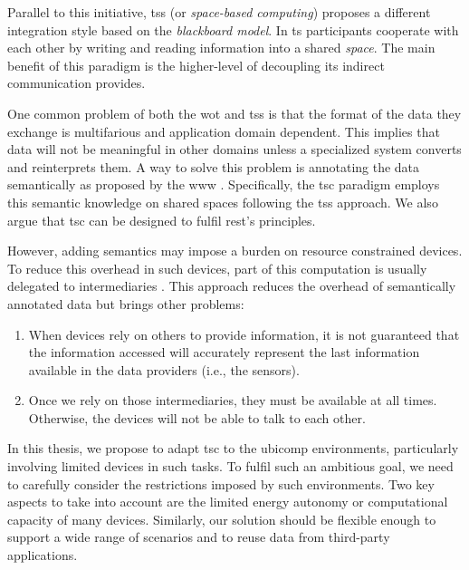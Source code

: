 
Parallel to this initiative, \aclp{ts} (or \emph{space-based computing}) \citep{gelernter_generative_1985} proposes a different integration style based on the \emph{blackboard model}.
In \ac{ts} participants cooperate with each other by writing and reading information into a shared \emph{space}.
The main benefit of this paradigm is the higher-level of decoupling its indirect communication provides. %


\bigskip

One common problem of both the \ac{wot} and \aclp{ts} is that the format of the data they exchange is multifarious and application domain dependent.
This implies that data will not be meaningful in other domains unless a specialized system converts and reinterprets them.
A way to solve this problem is annotating the data semantically as proposed by the \ac{www} \citep{berners-lee_semantic_2001}.
Specifically, the \ac{tsc} paradigm \citep{fensel_triple-space_2004} employs this semantic knowledge on shared spaces following the \aclp{ts} approach.
We also argue that \ac{tsc} can be designed to fulfil \ac{rest}'s principles.


However, adding semantics may impose a burden on resource constrained devices.
To reduce this overhead in such devices, part of this computation is usually delegated to intermediaries \citep{honkola_smart-m3_2010}. %
This approach reduces the overhead of semantically annotated data but brings other problems:
\begin{enumerate}
 \item When devices rely on others to provide information, it is not guaranteed that the information accessed will accurately represent the last information available in the data providers (i.e., the sensors).
 \item Once we rely on those intermediaries, they must be available at all times.
	Otherwise, the devices will not be able to talk to each other.
\end{enumerate}


\bigskip


In this thesis, we propose to adapt \ac{tsc} to the \ac{ubicomp} environments, particularly involving limited devices in such tasks.
To fulfil such an ambitious goal, we need to carefully consider the restrictions imposed by such environments.
Two key aspects to take into account are the limited energy autonomy or computational capacity of many devices.
Similarly, our solution should be flexible enough to support a wide range of scenarios and to reuse data from third-party applications.


